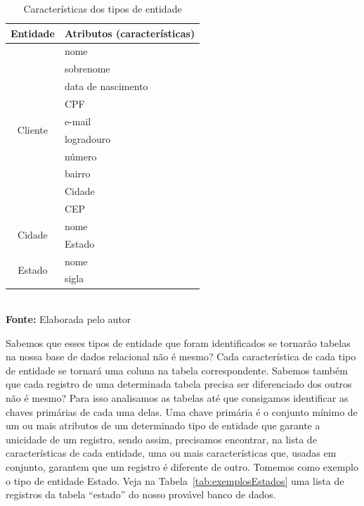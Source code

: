 \FloatBarrier
\begin{table}[ht]
    \centering
    \caption{Características dos tipos de entidade}
	\begin{tabular}{cl}
	    \hline
	        \textbf{Entidade}     & \textbf{Atributos (características)} \\ \hline
	    \multirow{10}{*}{Cliente} & nome                                 \\
	                              & sobrenome                            \\
	                              & data de nascimento                   \\
	                              & CPF                                  \\
	                              & e-mail                               \\
	                              & logradouro                           \\ 
	                              & número                               \\
	                              & bairro                               \\
	                              & Cidade                               \\
	                              & CEP                                  \\ \hline
	     \multirow{2}{*}{Cidade}  & nome                                 \\
	                              & Estado                               \\ \hline
	     \multirow{2}{*}{Estado}  & nome                                 \\
	                              & sigla                                \\ \hline
	\end{tabular}
    \\ \vspace{0.2cm}
    \textbf{Fonte:} Elaborada pelo autor
    \label{tab:caracteristicasEntidades}
\end{table}
\FloatBarrier

Sabemos que esses tipos de entidade que foram identificados se tornarão tabelas na nossa base de dados relacional não é mesmo? Cada característica de cada tipo de entidade se tornará uma coluna na tabela correspondente. Sabemos também que cada registro de uma determinada tabela precisa ser diferenciado dos outros não é mesmo? Para isso analisamos as tabelas até que consigamos identificar as chaves primárias de cada uma delas. Uma chave primária é o conjunto mínimo de um ou mais atributos de um determinado tipo de entidade que garante a unicidade de um registro, sendo assim, precisamos encontrar, na lista de características de cada entidade, uma ou mais características que, usadas em conjunto, garantem que um registro é diferente de outro. Tomemos como exemplo o tipo de entidade Estado. Veja na Tabela~\ref{tab:exemplosEstados} uma lista de registros da tabela ``estado'' do nosso provável banco de dados.


